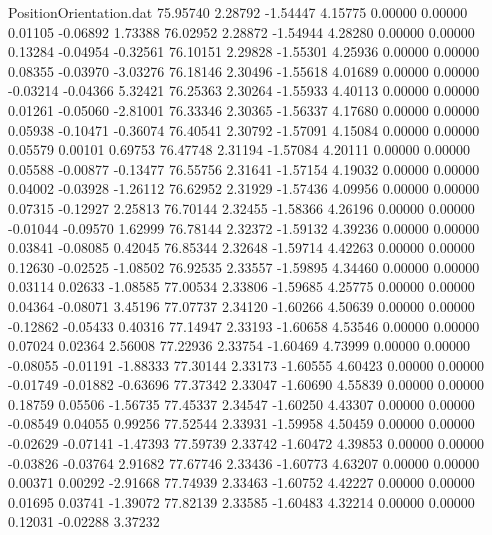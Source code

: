 \begin{filecontents}{PositionOrientation.dat}
  75.95740    2.28792   -1.54447     4.15775    0.00000    0.00000    0.01105   -0.06892    1.73388
  76.02952    2.28872   -1.54944     4.28280    0.00000    0.00000    0.13284   -0.04954   -0.32561
  76.10151    2.29828   -1.55301     4.25936    0.00000    0.00000    0.08355   -0.03970   -3.03276
  76.18146    2.30496   -1.55618     4.01689    0.00000    0.00000   -0.03214   -0.04366    5.32421
  76.25363    2.30264   -1.55933     4.40113    0.00000    0.00000    0.01261   -0.05060   -2.81001
  76.33346    2.30365   -1.56337     4.17680    0.00000    0.00000    0.05938   -0.10471   -0.36074
  76.40541    2.30792   -1.57091     4.15084    0.00000    0.00000    0.05579    0.00101    0.69753
  76.47748    2.31194   -1.57084     4.20111    0.00000    0.00000    0.05588   -0.00877   -0.13477
  76.55756    2.31641   -1.57154     4.19032    0.00000    0.00000    0.04002   -0.03928   -1.26112
  76.62952    2.31929   -1.57436     4.09956    0.00000    0.00000    0.07315   -0.12927    2.25813
  76.70144    2.32455   -1.58366     4.26196    0.00000    0.00000   -0.01044   -0.09570    1.62999
  76.78144    2.32372   -1.59132     4.39236    0.00000    0.00000    0.03841   -0.08085    0.42045
  76.85344    2.32648   -1.59714     4.42263    0.00000    0.00000    0.12630   -0.02525   -1.08502
  76.92535    2.33557   -1.59895     4.34460    0.00000    0.00000    0.03114    0.02633   -1.08585
  77.00534    2.33806   -1.59685     4.25775    0.00000    0.00000    0.04364   -0.08071    3.45196
  77.07737    2.34120   -1.60266     4.50639    0.00000    0.00000   -0.12862   -0.05433    0.40316
  77.14947    2.33193   -1.60658     4.53546    0.00000    0.00000    0.07024    0.02364    2.56008
  77.22936    2.33754   -1.60469     4.73999    0.00000    0.00000   -0.08055   -0.01191   -1.88333
  77.30144    2.33173   -1.60555     4.60423    0.00000    0.00000   -0.01749   -0.01882   -0.63696
  77.37342    2.33047   -1.60690     4.55839    0.00000    0.00000    0.18759    0.05506   -1.56735
  77.45337    2.34547   -1.60250     4.43307    0.00000    0.00000   -0.08549    0.04055    0.99256
  77.52544    2.33931   -1.59958     4.50459    0.00000    0.00000   -0.02629   -0.07141   -1.47393
  77.59739    2.33742   -1.60472     4.39853    0.00000    0.00000   -0.03826   -0.03764    2.91682
  77.67746    2.33436   -1.60773     4.63207    0.00000    0.00000    0.00371    0.00292   -2.91668
  77.74939    2.33463   -1.60752     4.42227    0.00000    0.00000    0.01695    0.03741   -1.39072
  77.82139    2.33585   -1.60483     4.32214    0.00000    0.00000    0.12031   -0.02288    3.37232

\end{filecontents}
